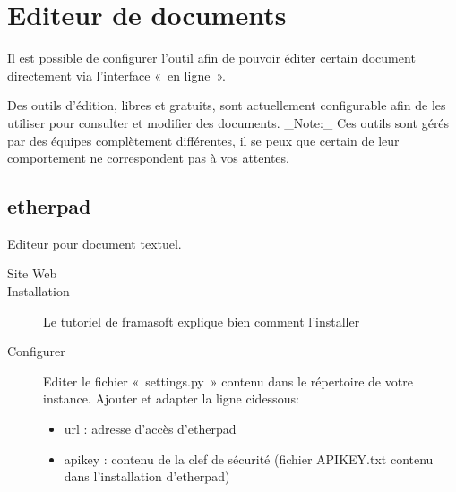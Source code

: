 \documentclass[letterpaper,10pt,french]{sphinxmanual}
\begin{document}
\section{Editeur de documents}
\label{\detokenize{documents/editor:editeur-de-documents}}\label{\detokenize{documents/editor::doc}}
Il est possible de configurer l’outil afin de pouvoir éditer certain document directement via l’interface « en ligne ».

Des outils d’édition, libres et gratuits, sont actuellement configurable afin de les utiliser pour consulter et modifier des documents.
\_Note:\_ Ces outils sont gérés par des équipes complètement différentes, il se peux que certain de leur comportement ne correspondent pas à vos attentes.


\subsection{etherpad}
\label{\detokenize{documents/editor:etherpad}}
Editeur pour document textuel.
\begin{description}
\item[{Site Web}] \leavevmode
{}

\item[{Installation}] \leavevmode
Le tutoriel de framasoft explique bien comment l’installer

\item[{Configurer}] \leavevmode
Editer le fichier « settings.py » contenu dans le répertoire de votre instance.
Ajouter et adapter la ligne ci\sphinxhyphen{}dessous:
\begin{itemize}
\item {} 
url : adresse d’accès d’etherpad

\item {} 
apikey : contenu de la clef de sécurité (fichier APIKEY.txt contenu dans l’installation d’etherpad)

\end{itemize}

\end{description}
\end{document}
